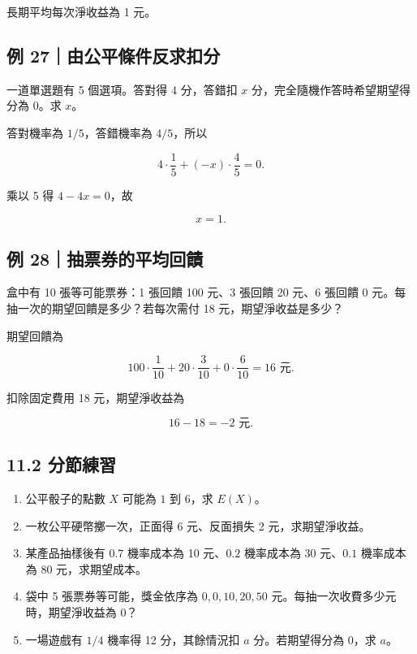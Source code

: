 \documentclass[11pt,a4paper]{article}
\providecommand{\tightlist}{%
  \setlength{\itemsep}{0pt}\setlength{\parskip}{0pt}}
\begin{document}
長期平均每次淨收益為 1 元。

\subsection{例 27｜由公平條件反求扣分}\label{ux4f8b-27ux7531ux516cux5e73ux689dux4ef6ux53cdux6c42ux6263ux5206}

一道單選題有 5 個選項。答對得 4 分，答錯扣 \(x\) 分，完全隨機作答時希望期望得分為 0。求 \(x\)。

答對機率為 \(1/5\)，答錯機率為 \(4/5\)，所以

\[
4\cdot\frac15+(-x)\cdot\frac45=0.
\]

乘以 5 得 \(4-4x=0\)，故

\[
x=1.
\]

\subsection{例 28｜抽票券的平均回饋}\label{ux4f8b-28ux62bdux7968ux5238ux7684ux5e73ux5747ux56deux994b}

盒中有 10 張等可能票券：1 張回饋 100 元、3 張回饋 20 元、6 張回饋 0 元。每抽一次的期望回饋是多少？若每次需付 18 元，期望淨收益是多少？

期望回饋為

\[
100\cdot\frac1{10}+20\cdot\frac3{10}+0\cdot\frac6{10}=16\text{ 元}.
\]

扣除固定費用 18 元，期望淨收益為

\[
16-18=-2\text{ 元}.
\]

\subsection{11.2 分節練習}\label{ux5206ux7bc0ux7df4ux7fd2-10}

\begin{enumerate}
\def\labelenumi{\arabic{enumi}.}
\tightlist
\item
  公平骰子的點數 \(X\) 可能為 \(1\) 到 \(6\)，求 \(E(X)\)。
\item
  一枚公平硬幣擲一次，正面得 6 元、反面損失 2 元，求期望淨收益。
\item
  某產品抽樣後有 \(0.7\) 機率成本為 10 元、\(0.2\) 機率成本為 30 元、\(0.1\) 機率成本為 80 元，求期望成本。
\item
  袋中 5 張票券等可能，獎金依序為 \(0,0,10,20,50\) 元。每抽一次收費多少元時，期望淨收益為 0？
\item
  一場遊戲有 \(1/4\) 機率得 12 分，其餘情況扣 \(a\) 分。若期望得分為 0，求 \(a\)。
\end{enumerate}
\end{document}
